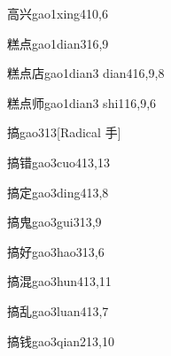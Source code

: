 \begin{verbete}{高兴}{gao1xing4}{10,6}
\end{verbete}

\begin{verbete}{糕点}{gao1dian3}{16,9}
\end{verbete}

\begin{verbete}{糕点店}{gao1dian3 dian4}{16,9,8}
\end{verbete}

\begin{verbete}{糕点师}{gao1dian3 shi1}{16,9,6}
\end{verbete}

\begin{verbete}{搞}{gao3}{13}[Radical 手]
\end{verbete}

\begin{verbete}{搞错}{gao3cuo4}{13,13}
\end{verbete}

\begin{verbete}{搞定}{gao3ding4}{13,8}
\end{verbete}

\begin{verbete}{搞鬼}{gao3gui3}{13,9}
\end{verbete}

\begin{verbete}{搞好}{gao3hao3}{13,6}
\end{verbete}

\begin{verbete}{搞混}{gao3hun4}{13,11}
\end{verbete}

\begin{verbete}{搞乱}{gao3luan4}{13,7}
\end{verbete}

\begin{verbete}{搞钱}{gao3qian2}{13,10}
\end{verbete}

